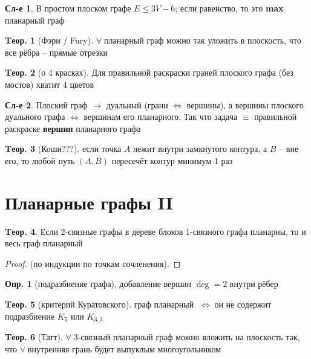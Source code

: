 \documentclass[a4paper,12pt]{article}
\numberwithin{figure}{section}
\theoremstyle{definition}
\newtheorem{definition}{Опр.}[section]
\theoremstyle{definition}
\newtheorem{theorem}{Tеор.}[section]
\newtheorem*{corollary}{Сл-е} %
\def\iiff{$\;\Longleftrightarrow\;$}
\def\iiany{$\forall\;$}
\begin{document}
\begin{corollary}
	В простом плоском графе $E \leqslant 3V-6$; если равенство, то это \textbf{max} планарный граф
\end{corollary}

\begin{theorem}[Фэри / Fury]
	\iiany планарный граф можно так уложить в плоскость, что все рёбра -- прямые отрезки 
\end{theorem}

\begin{theorem}[о 4 красках]
	Для правильной раскраски граней плоского графа (без мостов) хватит 4 цветов
\end{theorem}

\begin{corollary}
	Плоский граф $\longrightarrow$ дуальный (грани $\Leftrightarrow$ вершины), а вершины плоского дуального графа $\Leftrightarrow$ вершинам его планарного. Так что задача $\equiv$ правильной раскраске \textbf{вершин} планарного графа
\end{corollary}

\begin{theorem}[Коши???]
	если точка $A$ лежит внутри замкнутого контура, а $B$ -- вне его, то любой путь $(A,B)$ пересечёт контур минимум 1 раз
\end{theorem}


\section{Планарные графы II}

\begin{theorem}
	Если 2-связные графы в дереве блоков 1-связного графа планарны, то и весь граф планарный 
\end{theorem}
\begin{proof}
	(по индукции по точкам сочленения).
\end{proof}

\begin{definition}[подразбиение графа] добавление вершин $\deg=2$ внутри рёбер \end{definition}

\begin{theorem}[критерий Куратовского]
	граф планарный \iiff он не содержит подразбиение $K_5$ или $K_{3,3}$
\end{theorem}

\begin{theorem}[Татт]
	\iiany 3-связный планарный граф можно вложить на плоскость так, что \iiany внутренняя грань будет выпуклым многоугольником
\end{theorem}
\end{document}
